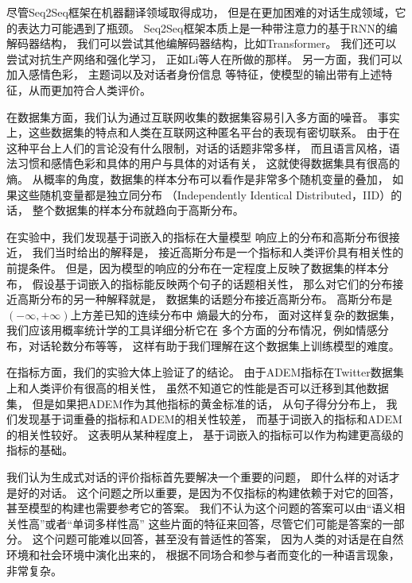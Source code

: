 尽管Seq2Seq框架在机器翻译领域取得成功，
但是在更加困难的对话生成领域，它的表达力可能遇到了瓶颈。
Seq2Seq框架本质上是一种带注意力的基于RNN的编解码器结构，
我们可以尝试其他编解码器结构，比如Transformer。
我们还可以尝试对抗生产网络和强化学习，
正如Li等人在\cite{deep_RL,Adversarial}所做的那样。
另一方面，我们可以加入感情色彩，
主题词以及对话者身份信息
等特征，使模型的输出带有上述特征，从而更加符合人类评价。

在数据集方面，我们认为通过互联网收集的数据集容易引入多方面的噪音。
事实上，这些数据集的特点和人类在互联网这种匿名平台的表现有密切联系。
由于在这种平台上人们的言论没有什么限制，对话的话题非常多样，
而且语言风格，语法习惯和感情色彩和具体的用户与具体的对话有关，
这就使得数据集具有很高的熵。
从概率的角度，数据集的样本分布可以看作是非常多个随机变量的叠加，
如果这些随机变量都是独立同分布
（Independently Identical Distributed，IID）的话，
整个数据集的样本分布就趋向于高斯分布。

在实验中，我们发现基于词嵌入的指标在大量模型
响应上的分布和高斯分布很接近，
我们当时给出的解释是，
接近高斯分布是一个指标和人类评价具有相关性的前提条件。
但是，因为模型的响应的分布在一定程度上反映了数据集的样本分布，
假设基于词嵌入的指标能反映两个句子的话题相关性，
那么对它们的分布接近高斯分布的另一种解释就是，
数据集的话题分布接近高斯分布。
高斯分布是$(-\infty, +\infty)$上方差已知的连续分布中
熵最大的分布，
面对这样复杂的数据集，我们应该用概率统计学的工具详细分析它在
多个方面的分布情况，例如情感分布，对话轮数分布等等，
这样有助于我们理解在这个数据集上训练模型的难度。

在指标方面，我们的实验大体上验证了\cite{HowNot}的结论。
由于ADEM指标在Twitter数据集上和人类评价有很高的相关性，
虽然不知道它的性能是否可以迁移到其他数据集，
但是如果把ADEM作为其他指标的黄金标准的话，
从句子得分分布上，
我们发现基于词重叠的指标和ADEM的相关性较差，
而基于词嵌入的指标和ADEM的相关性较好。
这表明从某种程度上，
基于词嵌入的指标可以作为构建更高级的指标的基础。

我们认为生成式对话的评价指标首先要解决一个重要的问题，
即什么样的对话才是好的对话。
这个问题之所以重要，是因为不仅指标的构建依赖于对它的回答，
甚至模型的构建也需要参考它的答案。
我们不认为这个问题的答案可以由“语义相关性高”或者“单词多样性高”
这些片面的特征来回答，尽管它们可能是答案的一部分。
这个问题可能难以回答，甚至没有普适性的答案，
因为人类的对话是在自然环境和社会环境中演化出来的，
根据不同场合和参与者而变化的一种语言现象，非常复杂。

